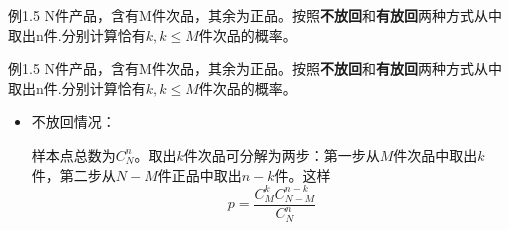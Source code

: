\documentclass{beamer}
\begin{document}
		\begin{frame}
		例1.5 N件产品，含有M件次品，其余为正品。按照\textbf{不放回}和\textbf{有放回}两种方式从中取出n件.分别计算恰有$k, k \leq M$件次品的概率。
	\end{frame}
	
	\begin{frame}
		例1.5 N件产品，含有M件次品，其余为正品。按照\textbf{不放回}和\textbf{有放回}两种方式从中取出n件.分别计算恰有$k, k \leq M$件次品的概率。
		\begin{itemize}
			\item 不放回情况：
			
			样本点总数为$C_N^n$。取出$k$件次品可分解为两步：第一步从$M$件次品中取出$k$件，第二步从$N - M$件正品中取出$n - k$件。这样
			\[
			p = \frac{C_M^k C_{N - M}^{n - k}}{C_N^n}
			\]	
		\end{itemize}
	\end{frame}
	
\end{document}
